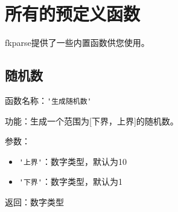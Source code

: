 \chapter{所有的预定义函数}

fkparse提供了一些内置函数供您使用。

\section{随机数}

函数名称：\verb|'生成随机数'|

功能：生成一个范围为[下界，上界]的随机数。

参数：

\begin{itemize}
  \item \verb|'上界'|：数字类型，默认为10
  \item \verb|'下界'|：数字类型，默认为1
\end{itemize}

返回：数字类型
